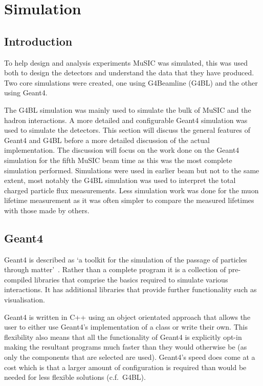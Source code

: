\chapter{Simulation} %
\label{prt:simulation}
\section{Introduction} %
\label{cha:sim_introduction}
To help design and analysis experiments MuSIC was simulated, this was used both to design the detectors and understand the data that they have produced. Two core simulations were created, one using G4Beamline (G4BL) and the other using Geant4. 

The G4BL simulation was mainly used to simulate the bulk of MuSIC and the hadron interactions. A more detailed and configurable Geant4 simulation was used to simulate the detectors. This section will discuss the general features of Geant4 and G4BL before a more detailed discussion of the actual implementation. The discussion will focus on the work done on the Geant4 simulation for the fifth MuSIC beam time as this was the most complete simulation performed. Simulations were used in earlier beam but not to the same extent, most notably the G4BL simulation was used to interpret the total charged particle flux measurements. Less simulation work was done for the muon lifetime measurement as it was often simpler to compare the measured lifetimes with those made by others.

\section{Geant4} %
\label{sec:geant4}
Geant4 is described as `a toolkit for the simulation of the passage of particles through matter'~\cite{Geant4 REF}. Rather than a complete program it is a collection of pre-compiled libraries that comprise the basics required to simulate various interactions. It has additional libraries that provide further functionality such as visualisation. 

Geant4 is written in C++ using an object orientated approach that allows the user to either use Geant4's implementation of a class or write their own. This flexibility also means that all the functionality of Geant4 is explicitly opt-in making the resultant programs much faster than they would otherwise be (as only the components that are selected are used). Geant4's speed does come at a cost which is that a larger amount of configuration is required than would be needed for less flexible solutions (c.f.\ G4BL).

